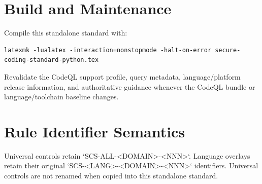 \documentclass[10pt,letterpaper]{article}
\begin{document}
\appendix
\section{Build and Maintenance}
Compile this standalone standard with:
\begin{lstlisting}
latexmk -lualatex -interaction=nonstopmode -halt-on-error secure-coding-standard-python.tex
\end{lstlisting}
Revalidate the CodeQL support profile, query metadata, language/platform release information, and authoritative guidance whenever the CodeQL bundle or language/toolchain baseline changes.

\section{Rule Identifier Semantics}
Universal controls retain `SCS-ALL-<DOMAIN>-<NNN>`. Language overlays retain their original `SCS-<LANG>-<DOMAIN>-<NNN>` identifiers. Universal controls are not renamed when copied into this standalone standard.
\end{document}
